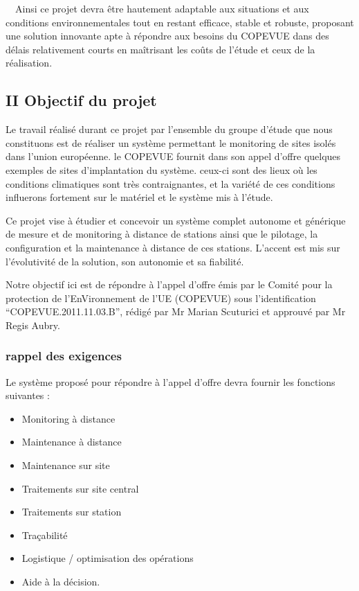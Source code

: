 \documentclass{article}
\begin{document}
\ \ Ainsi ce projet devra être hautement adaptable aux situations et aux
conditions environnementales tout en restant efficace, stable et
robuste, proposant une solution innovante apte à répondre aux besoins
du COPEVUE dans des délais relativement courts en maîtrisant les coûts
de l’étude et ceux de la réalisation.

\subsection[II Objectif du projet]{II Objectif du projet}
Le travail réalisé durant ce projet par l’ensemble du groupe d’étude que
nous constituons est de réaliser un système permettant le monitoring de
sites isolés dans l’union européenne. le COPEVUE fournit dans son appel
d’offre quelques exemples de sites d’implantation du système. ceux-ci
sont des lieux où les conditions climatiques sont très contraignantes,
et la variété de ces conditions influerons fortement sur le matériel et
le système mis à l’étude.

Ce projet vise à étudier et concevoir un système complet autonome et
générique de mesure et de monitoring à distance de stations ainsi que
le pilotage, la configuration et la maintenance à distance de ces
stations. L’accent est mis sur l’évolutivité de la solution, son
autonomie et sa fiabilité.

Notre objectif ici est de répondre à l’appel d’offre émis par le Comité
pour la protection de l’EnVironnement de l’UE (COPEVUE) sous
l’identification “COPEVUE.2011.11.03.B”, rédigé par Mr Marian Scuturici
et approuvé par Mr Regis Aubry.

\subsubsection[rappel des exigences]{rappel des exigences}
Le système proposé pour répondre à l’appel d’offre devra fournir les
fonctions suivantes : 

\begin{itemize}
\item Monitoring à distance
\item Maintenance à distance
\item Maintenance sur site
\item Traitements sur site central
\item Traitements sur station
\item Traçabilité
\item Logistique / optimisation des opérations
\item Aide à la décision.
\end{itemize}
\end{document}
